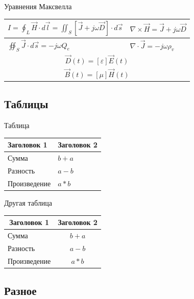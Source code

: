 \begin{frame}[allowframebreaks]{Уравнения Максвелла}
{\begin{tabular}{ll}
      \(I = \displaystyle\oint_L \vec H \cdot d\vec{l} = \displaystyle\iint_S \left[\vec J + j \omega \vec D\right] \cdot d\vec{s}\)
      & \(\nabla \times \vec H = \vec J + j \omega \vec{D}\) \\
      \midrule
      \(\displaystyle\oiint_S \vec J \cdot d\vec{s} = - j \omega Q_e\)
      & \(\nabla \cdot \vec J = - j \omega \rho_v\) \\
      \bottomrule
      \multicolumn{2}{c}{\(\vec D(t) = \left[\varepsilon\right] \vec E(t)\)} \\
      \multicolumn{2}{c}{\(\vec B(t) = \left[\mu\right] \vec H(t)\)} \\
    \end{tabular}
  }
\end{frame}

\subsection{Таблицы}

\begin{frame}{Таблица}
  \centering
  \begin{tabular}{|l|l|}
    \hline
    \textbf{Заголовок 1} & \textbf{Заголовок 2} \\
    \hline
    Сумма        & \(b+a\) \\
    \hline
    Разность     & \(a-b\) \\
    \hline
    Произведение & \(a*b\) \\
    \hline
  \end{tabular}
\end{frame}

\begin{frame}{Другая таблица}
  \centering
  \begin{tabular}{lc}
    \toprule
    \multicolumn{1}{c}{\textbf{Заголовок 1}} & \textbf{Заголовок 2} \\
    \midrule
    Сумма        & \(b+a\) \\
    Разность     & \(a-b\) \\
    Произведение & \(a*b\) \\
    \bottomrule
  \end{tabular}
\end{frame}

\subsection{Разное}

